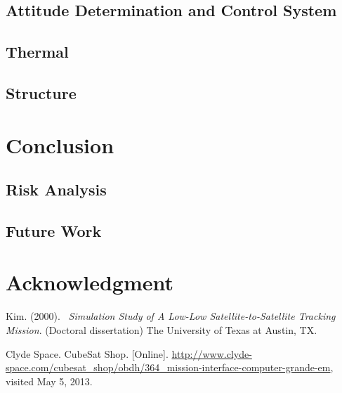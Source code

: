 \documentclass[12pt]{article}
\begin{document}
		\subsection{Attitude Determination and Control System}
		\subsection{Thermal}
		\subsection{Structure}
\section{Conclusion}
		\subsection{Risk Analysis}
		\subsection{Future Work}
\section{Acknowledgment}
	
	


\begin{thebibliography}{9}

   Kim. (2000).
  \emph{\ Simulation Study of A Low-Low Satellite-to-Satellite Tracking Mission}. (Doctoral dissertation)
  The University of Texas at Austin, TX.

Clyde Space. CubeSat Shop. [Online]. \url{http://www.clyde-space.com/cubesat_shop/obdh/364_mission-interface-computer-grande-em}, visited May 5, 2013. 
 

\end{thebibliography}
\end{document}
